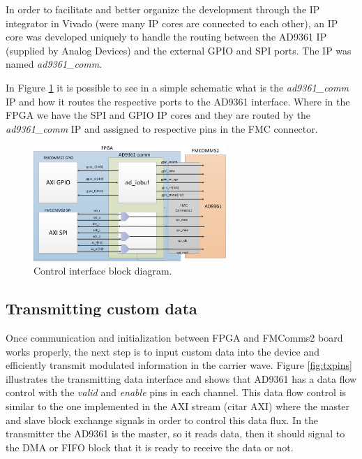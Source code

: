 In order to facilitate and better organize the development through the IP
integrator in Vivado (were many IP cores are connected to each other), an IP
core was developed uniquely to handle the routing between the AD9361 IP
(supplied by Analog Devices) and the external GPIO and SPI ports. The IP was
named \emph{ad9361\_comm}.

In Figure \ref{fig:commif} it is possible to see in a simple schematic what is
the \emph{ad9361\_comm} IP and how it routes the respective ports to the AD9361
interface. Where in the FPGA we have the SPI and GPIO IP cores and they are
routed by the \emph{ad9361\_comm} IP and assigned to respective pins in the FMC
connector.

\begin{figure}[htbp]
    \centering
    \includegraphics[width=0.65\textwidth]{./figures/comm_if}
    \caption{ Control interface block diagram.
    \label{fig:commif}}
\end{figure}

\subsection{Transmitting custom data}

Once communication and initialization between FPGA and FMComms2 board works
properly, the next step is to input custom data into the device and efficiently
transmit modulated information in the carrier wave. Figure \ref{fig:txpins}
illustrates the transmitting data interface and shows that AD9361 has a data
flow control with the \emph{valid} and \emph{enable} pins in each channel. This
data flow control is similar to the one implemented in the AXI stream (citar
AXI) where the master and slave block exchange signals in order to control this
data flux. In the transmitter the AD9361 is the master, so it reads data, then
it should signal to the DMA or FIFO block that it is ready to receive the data
or not.

